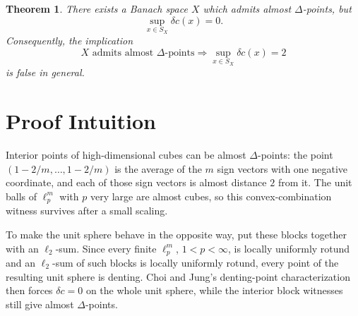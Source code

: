 \documentclass[11pt]{article}
\newtheorem{theorem}{Theorem}
\newcommand{\dec}{\delta c}
\begin{document}
\begin{theorem}
There exists a Banach space \(X\) which admits almost \(\Delta\)-points, but
\[
  \sup_{x\in S_X}\dec(x)=0.
\]
Consequently, the implication
\[
  X \text{ admits almost \(\Delta\)-points}
  \Longrightarrow
  \sup_{x\in S_X}\dec(x)=2
\]
is false in general.
\end{theorem}

\section*{Proof Intuition}

Interior points of high-dimensional cubes can be almost \(\Delta\)-points: the
point \((1-2/m,\ldots,1-2/m)\) is the average of the \(m\) sign vectors with
one negative coordinate, and each of those sign vectors is almost distance
\(2\) from it.  The unit balls of \(\ell_p^m\) with \(p\) very large are almost
cubes, so this convex-combination witness survives after a small scaling.

To make the unit sphere behave in the opposite way, put these blocks together
with an \(\ell_2\)-sum.  Since every finite \(\ell_p^m\), \(1<p<\infty\), is
locally uniformly rotund and an \(\ell_2\)-sum of such blocks is locally
uniformly rotund, every point of the resulting unit sphere is denting.  Choi
and Jung's denting-point characterization then forces \(\dec=0\) on the whole
unit sphere, while the interior block witnesses still give almost
\(\Delta\)-points.
\end{document}
